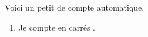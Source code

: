 \documentclass[12pt]{article}
\begin{document}
Voici un petit  de compte automatique.

\begin{enumerate}[label=\JNGPARAM{\alph*)}{type_liste}]
    \item Je compte en carrés .
\end{enumerate}
\end{document}
